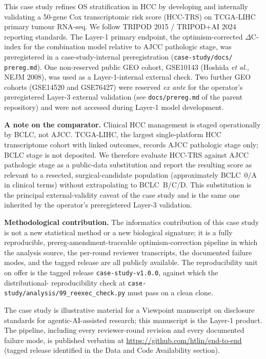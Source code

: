 \documentclass[12pt]{article}
\newcommand{\HCCRTS}{HCC-TRS\xspace}
\begin{document}
This case study refines OS stratification in HCC by developing and
internally validating a 50-gene Cox transcriptomic risk score (\HCCRTS)
on TCGA-LIHC primary tumour RNA-seq. We follow TRIPOD 2015 / TRIPOD+AI
2024 reporting standards.\citep{collins2015tripod,collins2024tripodai,moons2015transparent}
The Layer-1 primary endpoint, the optimism-corrected $\Delta$C-index for the
combination model relative to AJCC pathologic stage, was preregistered
in a case-study-internal preregistration (\texttt{case-study/docs/
prereg.md}). One non-reserved public GEO cohort, GSE10143
(Hoshida \emph{et al.},
NEJM 2008\citep{hoshida2008gene}), was used as a Layer-1-internal
external check. Two further GEO cohorts (GSE14520 and GSE76427) were
reserved \emph{ex ante} for the operator's preregistered Layer-3
external validation (see \texttt{docs/prereg.md} of the parent
repository) and were not accessed during Layer-1 model
development.

\textbf{A note on the comparator.} Clinical HCC management is staged
operationally by BCLC, not AJCC. TCGA-LIHC, the largest single-platform
HCC transcriptome cohort with linked outcomes, records AJCC pathologic
stage only; BCLC stage is not deposited. We therefore evaluate \HCCRTS
against AJCC pathologic stage as a public-data substitution and report
the resulting score as relevant to a resected, surgical-candidate
population (approximately BCLC~0/A in clinical terms) without
extrapolating to BCLC~B/C/D. This substitution is the principal
external-validity caveat of the case study and is the same one
inherited by the operator's preregistered Layer-3
validation.\citep{singal2023aasld,forner2018hepatocellular}

\textbf{Methodological contribution.}
The informatics contribution of this case study is not a new
statistical method or a new biological signature; it is a fully
reproducible, prereg-amendment-traceable optimism-correction pipeline
in which the analysis source, the per-round reviewer transcripts, the
documented failure modes, and the tagged release are all publicly
available. The reproducibility unit on offer is the tagged release
\texttt{case-study-v1.0.0}, against which the distributional-
reproducibility check at \texttt{case-study/analysis/99\_reexec\_check.py}
must pass on a clean clone.

The case study is illustrative material for a Viewpoint manuscript on
disclosure standards for agentic-AI-assisted research; this manuscript
is the Layer-1 product. The pipeline, including every reviewer-round
revision and every documented failure mode, is published verbatim at
\url{https://github.com/htlin/end-to-end} (tagged release identified
in the Data and Code Availability section).
\end{document}
